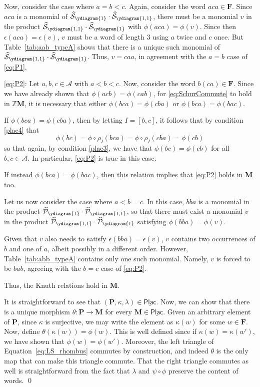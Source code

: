 \documentclass[12 pt]{amsart}
\newcommand{\Plactic}{{\mathbf{P}}}
\newcommand{\Free}{\mathbf{F}}
\newcommand{\Monoid}{\mathbf{M}}
\newcommand{\LSCategory}{\underline{\mathsf{Plac}}}
\newcommand{\FreeSchur}{\widehat{\mathcal{S}}}
\newcommand{\sFreeSchur}{\widehat{\mathcal{P}}}
\newcommand{\cA}{\mathcal{A}}
\theoremstyle{remark}
\numberwithin{equation}{section}
\begin{document}
Now, consider the case where $a = b < c$. Again, consider the word $aca \in \Free$. Since $aca$ is a monomial of $\FreeSchur_{\ydiagram{1}} \cdot \FreeSchur_{\ydiagram{1,1}}$, there must be a monomial $v$ in the product $\FreeSchur_{\ydiagram{1,1}} \cdot \FreeSchur_{\ydiagram{1}}$ with $\phi(aca) = \phi(v)$. Since then $\epsilon(aca) = \epsilon(v)$, $v$ must be a word of length $3$ using $a$ twice and $c$ once.
But Table~\ref{tab:aab_typeA} shows that there is a unique such monomial of $\FreeSchur_{\ydiagram{1,1}} \cdot \FreeSchur_{\ydiagram{1}}$. Thus, $v =caa$, in agreement with the $a=b$ case of \eqref{eq:P1}.

\medskip
\eqref{eq:P2}: 
Let $a,b,c\in \cA$ with $a<b<c$. Now, consider the word $b(ca)\in \Free.$ Since we have already shown that $\phi(acb) = \phi(cab)$, for \eqref{eq:SchurCommute} to hold in $\mathbb{Z}\Monoid$, it is necessary that either $\phi(bca)=\phi(cba)$ or $\phi(bca)=\phi(bac)$. 

If $\phi(bca)=\phi(cba)$, then by letting $I=[b,c]$, it follows that by condition \ref{plac4} that
\[\phi(bc) = \phi \circ \rho_I (bca) = \phi \circ \rho_I (cba) = \phi(cb) \]
so that again, by condition \ref{plac3}, we have that $\phi(bc)=\phi(cb)$ for all $b,c\in \cA.$ In particular, \eqref{eq:P2} is true in this case. 

If instead $\phi(bca)=\phi(bac)$, then this relation implies that \eqref{eq:P2} holds in $\Monoid$ too. 

Let us now consider the case where $a<b=c$. In this case, $bba$ is a monomial in the product $\sFreeSchur_{\ydiagram{1}}\cdot \sFreeSchur_{\ydiagram{1,1}}$, so that there must exist a monomial $v$ in the product $\sFreeSchur_{\ydiagram{1,1}}\cdot \sFreeSchur_{\ydiagram{1}}$ satisfying $\phi(bba)=\phi(v)$. 

Given that $v$ also needs to satisfy $\epsilon(bba)=\epsilon(v)$, $v$ contains two occurrences of $b$ and one of $a$, albeit possibly in a different order. However, Table~\ref{tab:abb_typeA} contains only one such monomial. Namely, $v$ is forced to be $bab$, agreeing with the $b=c$ case of \eqref{eq:P2}.

Thus, the Knuth relations hold in $\Monoid$.

It is straightforward to see that $(\Plactic,\kappa,\lambda) \in \LSCategory$.
Now, we can show that there is a unique morphism $\theta : \Plactic \to \Monoid$ for every $\Monoid \in \LSCategory$. Given an arbitrary element of $\Plactic$, since $\kappa$ is surjective, we may write the element as $\kappa(w)$ for some $w \in \Free$. Now, define $\theta(\kappa(w)) = \phi(w)$. This is well defined since if $\kappa(w) = \kappa(w')$, we have shown that $\phi(w) = \phi(w')$. Moreover, the left triangle of Equation~\eqref{eq:LS_rhombus} commutes by construction, and indeed $\theta$ is the only map that can make this triangle commute. That the right triangle commutes as well is straightforward from the fact that $\lambda$ and $\psi \circ \phi$ preserve the content of words. \qed
\end{document}
